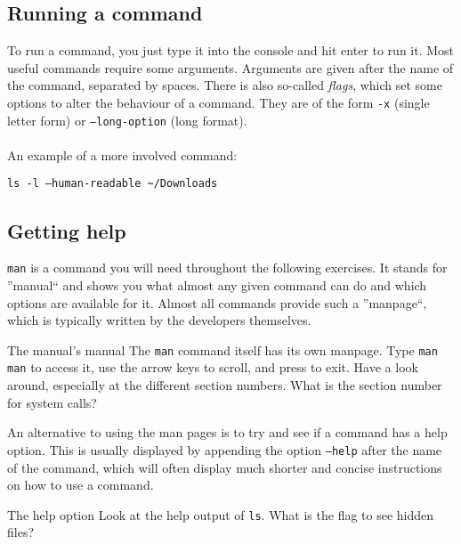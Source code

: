 \documentclass{TheAlternativeCourse}
\begin{document}
\subsection{Running a command}

To run a command, you just type it into the console and hit enter to run it.
Most useful commands require some arguments. Arguments are given after the name of
the command, separated by spaces. There is also so-called \emph{flags}, which
set some options to alter the behaviour of a command. They are of the form
\texttt{-x} (single letter form) or \texttt{--long-option} (long format). \\\\
%
An example of a more involved command:

\begin{cmdbox}
\texttt{ls -l --human-readable \textasciitilde/Downloads}
\end{cmdbox}

\subsection{Getting help}

\texttt{man} is a command you will need throughout the following
exercises.  It stands for ''manual`` and shows you what almost any given
command can do and which options are available for it.  Almost all commands
provide such a ''manpage``, which is typically written by the developers
themselves. \\
%
\begin{exercisebox}{The manual's manual}
    The \texttt{man} command itself has its own manpage. Type \texttt{man man}
    to access it, use the arrow keys to scroll, and press  to exit.
    Have a look around, especially at the different section numbers.
    What is the section number for system calls?
\end{exercisebox}
%
An alternative to using the man pages is to try and see if a command has a help
option. This is usually displayed by appending the option \texttt{--help} after
the name of the command, which will often display much shorter and concise
instructions
on how to use a command. \\
%
\begin{exercisebox}{The help option}
    Look at the help output of \texttt{ls}. What is the flag to see hidden files?
\end{exercisebox}
\end{document}
